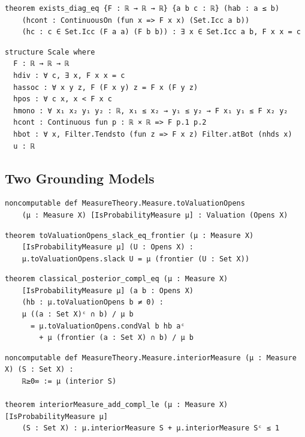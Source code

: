 \label{lean:exists-diag-eq}
\begin{lstlisting}
theorem exists_diag_eq {F : ℝ → ℝ → ℝ} {a b c : ℝ} (hab : a ≤ b)
    (hcont : ContinuousOn (fun x => F x x) (Set.Icc a b))
    (hc : c ∈ Set.Icc (F a a) (F b b)) : ∃ x ∈ Set.Icc a b, F x x = c
\end{lstlisting}

\label{lean:scale}
\begin{lstlisting}
structure Scale where
  F : ℝ → ℝ → ℝ
  hdiv : ∀ c, ∃ x, F x x = c
  hassoc : ∀ x y z, F (F x y) z = F x (F y z)
  hpos : ∀ c x, x < F x c
  hmono : ∀ x₁ x₂ y₁ y₂ : ℝ, x₁ ≤ x₂ → y₁ ≤ y₂ → F x₁ y₁ ≤ F x₂ y₂
  hcont : Continuous fun p : ℝ × ℝ => F p.1 p.2
  hbot : ∀ x, Filter.Tendsto (fun z => F x z) Filter.atBot (nhds x)
  u : ℝ
\end{lstlisting}

\subsection{Two Grounding Models}

\label{lean:measure-tovaluationopens}
\begin{lstlisting}
noncomputable def MeasureTheory.Measure.toValuationOpens
    (μ : Measure X) [IsProbabilityMeasure μ] : Valuation (Opens X)
\end{lstlisting}

\label{lean:tovaluationopens-slack-eq-frontier}
\begin{lstlisting}
theorem toValuationOpens_slack_eq_frontier (μ : Measure X)
    [IsProbabilityMeasure μ] (U : Opens X) :
    μ.toValuationOpens.slack U = μ (frontier (U : Set X))
\end{lstlisting}

\label{lean:classical-posterior-compl-eq}
\begin{lstlisting}
theorem classical_posterior_compl_eq (μ : Measure X)
    [IsProbabilityMeasure μ] (a b : Opens X)
    (hb : μ.toValuationOpens b ≠ 0) :
    μ ((a : Set X)ᶜ ∩ b) / μ b
      = μ.toValuationOpens.condVal b hb aᶜ
        + μ (frontier (a : Set X) ∩ b) / μ b
\end{lstlisting}

\label{lean:interiormeasure-add-compl-le}
\begin{lstlisting}
noncomputable def MeasureTheory.Measure.interiorMeasure (μ : Measure X) (S : Set X) :
    ℝ≥0∞ := μ (interior S)

theorem interiorMeasure_add_compl_le (μ : Measure X) [IsProbabilityMeasure μ]
    (S : Set X) : μ.interiorMeasure S + μ.interiorMeasure Sᶜ ≤ 1
\end{lstlisting}

